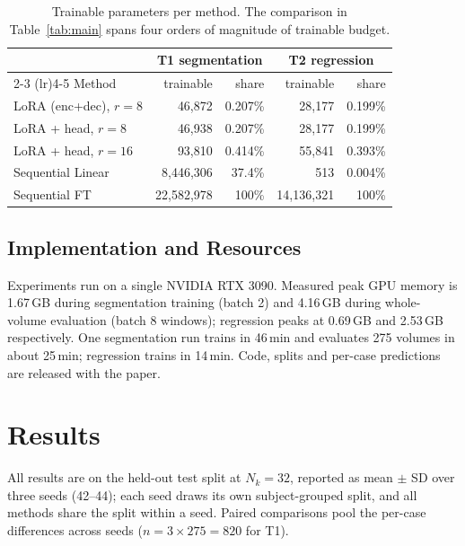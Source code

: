 \documentclass[journal,twoside,web]{ieeecolor}
\begin{document}
\begin{table}[t]
\caption{Trainable parameters per method. The comparison in Table~\ref{tab:main} spans four orders of magnitude of trainable budget.}
\label{tab:params}
\centering
\footnotesize
\setlength{\tabcolsep}{4pt}
\begin{tabular}{lrrrr}
\toprule
 & \multicolumn{2}{c}{T1 segmentation} & \multicolumn{2}{c}{T2 regression} \\
\cmidrule(lr){2-3} \cmidrule(lr){4-5}
Method & trainable & share & trainable & share \\
\midrule
LoRA (enc+dec), $r{=}8$   & 46,872     & 0.207\%  & 28,177     & 0.199\% \\
LoRA + head, $r{=}8$      & 46,938     & 0.207\%  & 28,177     & 0.199\% \\
LoRA + head, $r{=}16$     & 93,810     & 0.414\%  & 55,841     & 0.393\% \\
Sequential Linear         & 8,446,306  & 37.4\%   & 513        & 0.004\% \\
Sequential FT             & 22,582,978 & 100\%    & 14,136,321 & 100\% \\
\bottomrule
\end{tabular}
\end{table}

\subsection{Implementation and Resources}
\label{sec:impl}

Experiments run on a single NVIDIA RTX 3090. Measured peak GPU memory is 1.67\,GB during segmentation training (batch 2) and 4.16\,GB during whole-volume evaluation (batch 8 windows); regression peaks at 0.69\,GB and 2.53\,GB respectively. One segmentation run trains in 46\,min and evaluates 275 volumes in about 25\,min; regression trains in 14\,min. Code, splits and per-case predictions are released with the paper.

\section{Results}
\label{sec:results}

All results are on the held-out test split at $N_k=32$, reported as mean $\pm$ SD over three seeds (42--44); each seed draws its own subject-grouped split, and all methods share the split within a seed. Paired comparisons pool the per-case differences across seeds ($n = 3 \times 275 = 820$ for T1).
\end{document}
